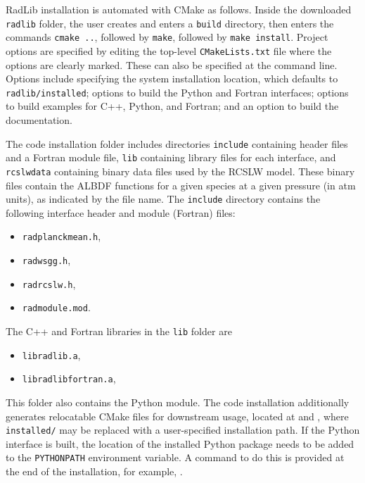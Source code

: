 \documentclass[preprint,12pt]{elsarticle}
\begin{document}
RadLib installation is automated with CMake as follows. Inside the downloaded \texttt{radlib} folder, the user creates and enters a \texttt{build} directory, then enters the commands \texttt{cmake ..}, followed by \texttt{make}, followed by \texttt{make install}. Project options are specified by editing the top-level \texttt{CMakeLists.txt} file where the options are clearly marked. These can also be specified at the command line. Options include specifying the system installation location, which defaults to \texttt{radlib/installed}; options to build the Python and Fortran interfaces; options to build examples for C++, Python, and Fortran; and an option to build the documentation. 

The code installation folder includes directories \texttt{include} containing header files and a Fortran module file, 
\texttt{lib} containing library files for each interface, and \texttt{rcslw\textunderscore data} containing binary data files used by the RCSLW model. These binary files contain the ALBDF functions for a given species at a given pressure (in atm units), as indicated by the file name. The \texttt{include} directory contains the following interface header and module (Fortran) files:
%
\begin{itemize}
    \item \texttt{rad\textunderscore planck\textunderscore mean.h},
    \item \texttt{rad\textunderscore wsgg.h},
    \item \texttt{rad\textunderscore rcslw.h},
    \item \texttt{rad\textunderscore module.mod}.
\end{itemize}
%
The C++ and Fortran libraries in the \texttt{lib} folder are
\begin{itemize}
    \item \texttt{libradlib.a},
    \item \texttt{libradlib\textunderscore fortran.a},
\end{itemize}
%
This folder also contains the Python module.
The code installation additionally generates relocatable CMake files for downstream usage, located at \texttt{} and \texttt{}, where \texttt{installed/} may be replaced with a user-specified installation path. If the Python interface is built, the location of the installed Python package needs to be added to the \texttt{PYTHONPATH} environment variable. A command to do this is provided at the end of the installation, for example, \texttt{}.
\end{document}
